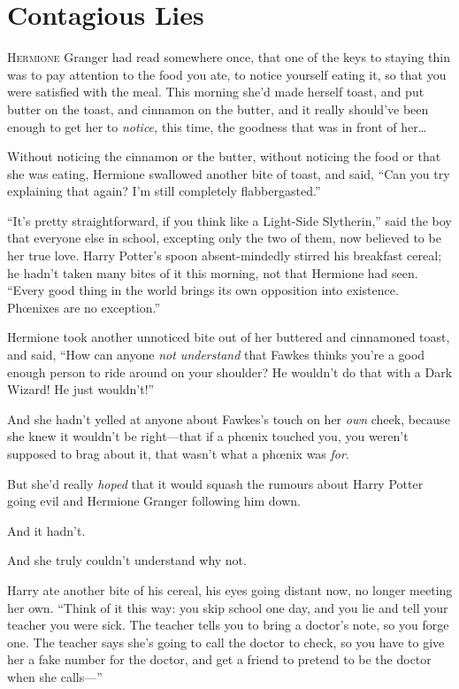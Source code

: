 \chapter{Contagious Lies}

\lettrine{H}{ermione} Granger had read somewhere once, that one of the keys to staying thin was to pay attention to the food you ate, to notice yourself eating it, so that you were satisfied with the meal. This morning she’d made herself toast, and put butter on the toast, and cinnamon on the butter, and it really should’ve been enough to get her to \emph{notice,} this time, the goodness that was in front of her…

Without noticing the cinnamon or the butter, without noticing the food or that she was eating, Hermione swallowed another bite of toast, and said, “Can you try explaining that again? I’m still completely flabbergasted.”

“It’s pretty straightforward, if you think like a Light-Side Slytherin,” said the boy that everyone else in school, excepting only the two of them, now believed to be her true love. Harry Potter’s spoon absent-mindedly stirred his breakfast cereal; he hadn’t taken many bites of it this morning, not that Hermione had seen. “Every good thing in the world brings its own opposition into existence. Phœnixes are no exception.”

Hermione took another unnoticed bite out of her buttered and cinnamoned toast, and said, “How can anyone \emph{not understand} that Fawkes thinks you’re a good enough person to ride around on your shoulder? He wouldn’t do that with a Dark Wizard! He just wouldn’t!”

And she hadn’t yelled at anyone about Fawkes’s touch on her \emph{own} cheek, because she knew it wouldn’t be right—that if a phœnix touched you, you weren’t supposed to brag about it, that wasn’t what a phœnix was \emph{for}.

But she’d really \emph{hoped} that it would squash the rumours about Harry Potter going evil and Hermione Granger following him down.

And it hadn’t.

And she truly couldn’t understand why not.

Harry ate another bite of his cereal, his eyes going distant now, no longer meeting her own. “Think of it this way: you skip school one day, and you lie and tell your teacher you were sick. The teacher tells you to bring a doctor’s note, so you forge one. The teacher says she’s going to call the doctor to check, so you have to give her a fake number for the doctor, and get a friend to pretend to be the doctor when she calls—”

